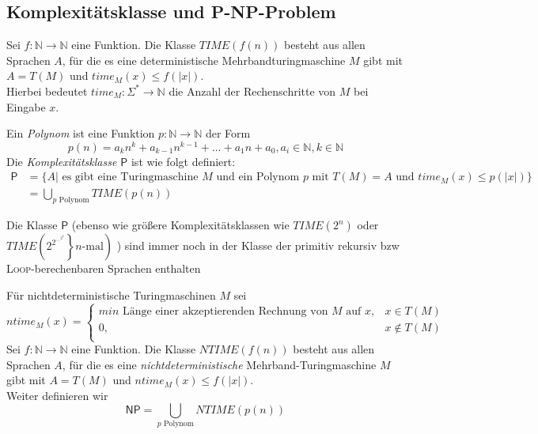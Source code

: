 \documentclass{scrartcl}
\begin{document}
\subsection*{Komplexitätsklasse und P-NP-Problem}
\begin{shaded}
    Sei $f:\mathds{N}\to \mathds{N}$ eine Funktion. Die Klasse $TIME(f(n))$ besteht aus allen Sprachen $A$, für die es eine deterministische Mehrbandturingmaschine $M$ gibt mit $A=T(M)$ und $time_M(x)\leq f(|x|)$.\\
    Hierbei bedeutet $time_M:\Sigma^*\to \mathds{N}$ die Anzahl der Rechenschritte von $M$ bei Eingabe $x$.
\end{shaded}

\begin{shaded}
    Ein \emph{Polynom} ist eine Funktion $p:\mathds{N}\to \mathds{N} $ der Form \[ p(n)=a_kn^k+a_{k-1}n^{k-1}+\dots+a_1n+a_0, a_i\in \mathds{N}, k\in \mathds{N} \]
    Die \emph{Komplexitätsklasse $\mathsf{P}$} ist wie folgt definiert:
    \begin{align*}
        \mathsf{P} &= \{A | \textrm{ es gibt eine Turingmaschine } M \textrm{ und ein Polynom } p \textrm{ mit } T(M)=A \textrm{ und } time_M(x)\leq p(|x|) \} \\
        &= \underset{p \textrm{ Polynom}}{\bigcup} TIME(p(n))
    \end{align*}
\end{shaded}

\begin{shaded}
    Die Klasse $\mathsf{P}$ (ebenso wie größere Komplexitätsklassen wie $TIME(2^n)$ oder $TIME\left(\left.2^{2^{\dots^{2^2}}}\right\}n\textrm{-mal}\right) $ ) sind immer noch in der Klasse der primitiv rekursiv bzw \textsc{Loop}-berechenbaren Sprachen enthalten
\end{shaded}

\begin{shaded}
    Für nichtdeterministische Turingmaschinen $M$ sei
    \[ ntime_M(x)=
    \begin{cases}
        min \textrm{ Länge einer akzeptierenden Rechnung von } M \textrm{ auf } x, & x\in T(M) \\
        0, & x\not\in T(M) \\
    \end{cases}
     \]
     Sei $f:\mathds{N}\to \mathds{N}$ eine Funktion. Die Klasse $NTIME(f(n))$ besteht aus allen Sprachen $A$, für die es eine \emph{nichtdeterministische} Mehrband-Turingmaschine $M$ gibt mit $A=T(M)$ und $ntime_M(x)\leq f(|x|)$. \\
     Weiter definieren wir
     \[ \mathsf{NP} = \underset{p \textrm{ Polynom}}{\bigcup} NTIME(p(n)) \]
\end{shaded}
\end{document}
